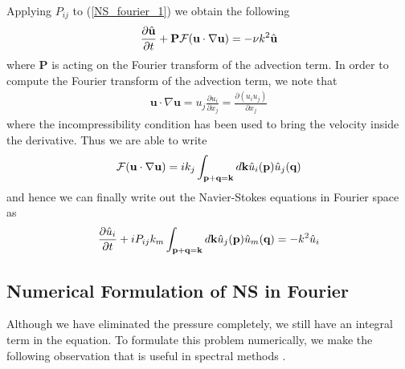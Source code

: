 Applying $P_{ij}$ to (\ref{NS_fourier_1}) we obtain the following 
\begin{align}
\frac{\partial \hat{\textbf{u}}}{\partial t} + \textbf{P}\mathcal{F}(\textbf{u}\cdot\nabla\textbf{u}) =  -\nu k^{2}\hat{\textbf{u}}\label{NS_fourier_3}
\end{align}
where $\textbf{P}$ is acting on the Fourier transform of the advection term. In order to compute the Fourier transform of the advection term, we note that 
\begin{align}
\textbf{u}\cdot\nabla\textbf{u} = u_{j}\frac{\partial u_{i}}{\partial x_{j}} = \frac{\partial (u_{i}u_{j})}{\partial x_{j}}
\end{align}
where the incompressibility condition has been used to bring the velocity inside the derivative. Thus we are able to write
\begin{align}
\mathcal{F}(\textbf{u}\cdot\nabla\textbf{u})=ik_{j}\int_{\textbf{p}+\textbf{q}=\textbf{k}}d\textbf{k}\hat{u}_{i}(\textbf{p})\hat{u}_{j}(\textbf{q})
\end{align}
and hence we can finally write out the Navier-Stokes equations in Fourier space as \cite{lesieur}
\begin{align}
\frac{\partial \hat{u}_{i}}{\partial t} + iP_{ij}k_{m}\int_{\textbf{p}+\textbf{q}=\textbf{k}}d\textbf{k}\hat{u}_{j}(\textbf{p})\hat{u}_{m}(\textbf{q})=  -k^{2}\hat{u}_{i}\label{NS_fourier_3}
\end{align}

\subsection{Numerical Formulation of NS in Fourier}
Although we have eliminated the pressure completely, we still have an integral term in the equation. To formulate this problem numerically, we make the following observation that is useful in spectral methods \cite{lesieur,orszag1972}.

